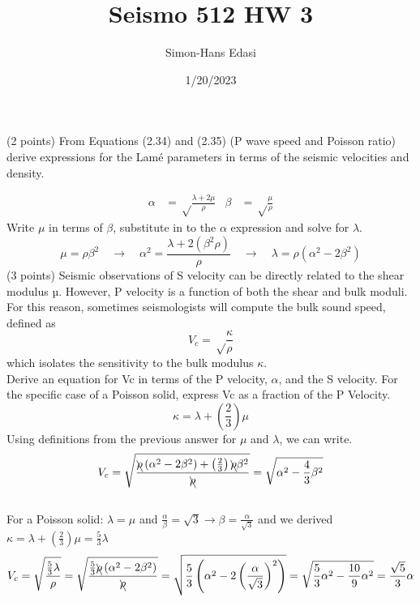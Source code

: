 \documentclass{article}
\title{Seismo 512 HW 3}
\date{1/20/2023}
\author{Simon-Hans Edasi}
\begin{document}
	\maketitle

(2 points) From Equations (2.34) and (2.35)  (P wave speed and Poisson ratio) derive expressions for the Lamé parameters in terms of the seismic velocities and density.




\begin{align*}
\alpha & =  \sqrt\frac{\lambda + 2 \mu}{\rho}   &   \beta & =    \sqrt\frac{\mu}{\rho}
\end{align*}
Write $\mu$ in terms of $\beta$, substitute in to the $\alpha$ expression and solve for $\lambda$.
\[
\mu = \rho\beta^{2} \quad \rightarrow \quad \alpha^{2} = \frac{\lambda + 2\left(\beta^{2}\rho\right)}{\rho} \quad \rightarrow \quad \lambda = \rho\left(\alpha^{2} - 2\beta^{2}\right)
\]
(3 points) Seismic observations of S velocity can be directly related to the shear modulus µ. However, P velocity is a function of both the shear and bulk moduli. For this reason, sometimes seismologists will compute the bulk sound speed, defined as
\[
V_c = \sqrt\frac{\kappa}{\rho}
\]
which isolates the sensitivity to the bulk modulus $\kappa$.\\

Derive an equation for Vc in terms of the P velocity, $\alpha$, and the S velocity. For the specific case of a Poisson solid, express Vc as a fraction of the P
Velocity.
\[
\kappa = \lambda + \left(\frac{2}{3}\right)\mu
\]
Using definitions from the previous answer for $\mu$ and $\lambda$, we can write.
\[
V_c = \sqrt{
\frac{\bcancel{ \rho } \left( \alpha^{2} - 2\beta^{2} \right) + \left( \frac{2}{3} \right)  \bcancel{ \rho }\beta^{2}  }
{\bcancel{ \rho }
}
}
= \sqrt{ \alpha^{2} - \frac{4}{3}\beta^{2}}
\]\\
For a Poisson solid: $\lambda = \mu$ and $\frac{\alpha}{\beta} = \sqrt{3}  \rightarrow \beta = \frac{\alpha}{\sqrt{3}}$ and we derived $\kappa = \lambda + \left(\frac{2}{3}\right)\mu = \frac{5}{3}\lambda$\\

\[
V_c = \sqrt\frac{\frac{5}{3} \lambda}{\rho} = \sqrt \frac{\frac{5}{3} \bcancel{\rho}  \left( \alpha^{2} - 2\beta^{2}  \right)}{\bcancel{\rho}} = \sqrt{ \frac{5}{3} \left( \alpha^{2} - 2\left( \frac{\alpha}{\sqrt{3}} \right)^{2} \right) }  = \sqrt{ \frac{5}{3} \alpha^2 - \frac{10}{9}\alpha^2} = \frac{\sqrt{5}}{3}\alpha
\]\\
\end{document}
